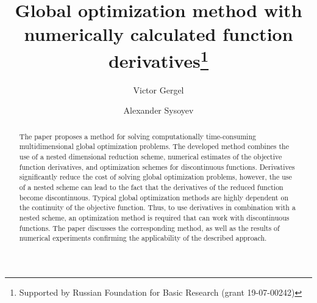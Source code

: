 \documentclass[runningheads]{llncs}
\begin{document}
%
\title{Global optimization method with numerically calculated function derivatives\thanks{Supported by Russian Foundation for Basic Research (grant 19-07-00242)}}
%
%
\author{Victor Gergel \and Alexander Sysoyev}
%
%
%
\maketitle              %
%
\begin{abstract}
The paper proposes a method for solving computationally time-consuming multidimensional global optimization problems. The developed method combines the use of a nested dimensional reduction scheme, numerical estimates of the objective function derivatives, and optimization schemes for discontinuous functions. Derivatives significantly reduce the cost of solving global optimization problems, however, the use of a nested scheme can lead to the fact that the derivatives of the reduced function become discontinuous. Typical global optimization methods are highly dependent on the continuity of the objective function. Thus, to use derivatives in combination with a nested scheme, an optimization method is required that can work with discontinuous functions. The paper discusses the corresponding method, as well as the results of numerical experiments confirming the applicability of the described approach.

\end{abstract}
%
%
%
\end{document}
